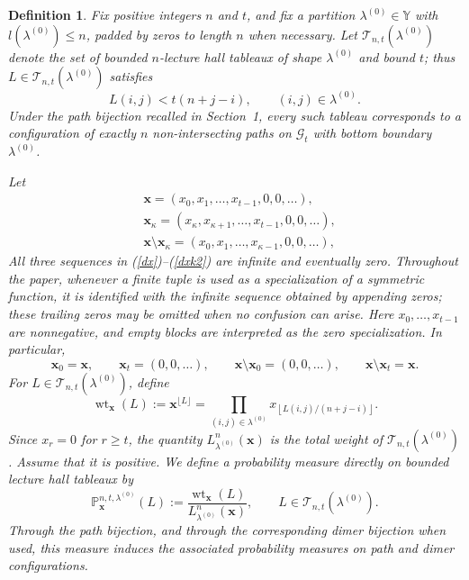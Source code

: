 \documentclass[11pt]{amsart}
\theoremstyle{plain}
\newtheorem{definition}[theorem]{Definition}
\newcommand\YY{{\mathbb {Y}}}
\renewcommand\ell{l}
\numberwithin{equation}{section}
\numberwithin{theorem}{section}
\numberwithin{figure}{section}
\begin{document}
\begin{definition}\label{df21}
Fix positive integers $n$ and $t$, and fix a partition
$\lambda^{(0)}\in\YY$ with $\ell(\lambda^{(0)})\leq n$, padded by zeros
to length $n$ when necessary. Let
$\mathcal{T}_{n,t}(\lambda^{(0)})$ denote the set of bounded
$n$-lecture hall tableaux of shape $\lambda^{(0)}$ and bound $t$; thus
$L\in\mathcal{T}_{n,t}(\lambda^{(0)})$ satisfies
\[
    L(i,j)<t(n+j-i),\qquad (i,j)\in\lambda^{(0)}.
\]
Under the path bijection recalled in Section~1, every such tableau corresponds
to a configuration of exactly $n$ non-intersecting paths on $\mathcal{G}_t$
with bottom boundary $\lambda^{(0)}$.

Let
\begin{align}
&\mathbf{x}=(x_0,x_1,\ldots,x_{t-1},0,0,\ldots),\label{dx}\\
&\mathbf{x}_{\kappa}=(x_{\kappa},x_{\kappa+1},\ldots,x_{t-1},0,0,\ldots),\label{dxk}\\
&\mathbf{x}\setminus\mathbf{x}_{\kappa}
=(x_0,x_1,\ldots,x_{\kappa-1},0,0,\ldots),\label{dxk2}
\end{align}
All three sequences in (\ref{dx})--(\ref{dxk2}) are infinite and eventually
zero. Throughout the paper, whenever a finite tuple is used as a
specialization of a symmetric function, it is identified with the infinite
sequence obtained by appending zeros; these trailing zeros may be omitted when
no confusion can arise. Here $x_0,\ldots,x_{t-1}$ are nonnegative, and empty
blocks are interpreted as the zero specialization. In particular,
\[
\mathbf{x}_0=\mathbf{x},\qquad
\mathbf{x}_t=(0,0,\ldots),\qquad
\mathbf{x}\setminus\mathbf{x}_0=(0,0,\ldots),\qquad
\mathbf{x}\setminus\mathbf{x}_t=\mathbf{x}.
\]
For $L\in\mathcal{T}_{n,t}(\lambda^{(0)})$, define
\[
    \operatorname{wt}_{\mathbf{x}}(L)
    :=\mathbf{x}^{\lfloor L\rfloor}
    =\prod_{(i,j)\in\lambda^{(0)}}
      x_{\left\lfloor L(i,j)/(n+j-i)\right\rfloor}.
\]
Since $x_r=0$ for $r\geq t$, the quantity
$L_{\lambda^{(0)}}^n(\mathbf{x})$ is the total weight of
$\mathcal{T}_{n,t}(\lambda^{(0)})$. Assume that it is positive. We define a
probability measure directly on bounded lecture hall tableaux by
\[
    \mathbb{P}_{\mathbf{x}}^{n,t,\lambda^{(0)}}(L)
    :=\frac{\operatorname{wt}_{\mathbf{x}}(L)}{L_{\lambda^{(0)}}^n(\mathbf{x})},
    \qquad L\in\mathcal{T}_{n,t}(\lambda^{(0)}).
\]
Through the path bijection, and through the corresponding dimer bijection when
used, this measure induces the associated probability measures on path and
dimer configurations.


\end{definition}
\end{document}
